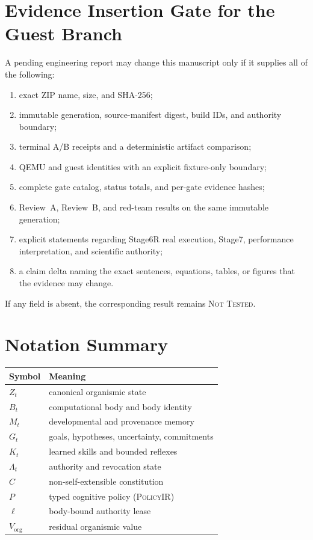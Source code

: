 \documentclass[journal,10pt]{IEEEtran}
\newcommand{\PolicyIR}{\textsc{PolicyIR}}
\newcommand{\NotTested}{\textsc{Not Tested}}
\begin{document}
\section{Evidence Insertion Gate for the Guest Branch}
A pending engineering report may change this manuscript only if it supplies all of the following:
\begin{enumerate}
  \item exact ZIP name, size, and SHA-256;
  \item immutable generation, source-manifest digest, build IDs, and authority boundary;
  \item terminal A/B receipts and a deterministic artifact comparison;
  \item QEMU and guest identities with an explicit fixture-only boundary;
  \item complete gate catalog, status totals, and per-gate evidence hashes;
  \item Review~A, Review~B, and red-team results on the same immutable generation;
  \item explicit statements regarding Stage6R real execution, Stage7, performance interpretation, and scientific authority;
  \item a claim delta naming the exact sentences, equations, tables, or figures that the evidence may change.
\end{enumerate}
If any field is absent, the corresponding result remains \NotTested{}.

\section{Notation Summary}
\begin{table}[t]
\centering
\small
\begin{tabular}{@{}ll@{}}
\toprule
Symbol & Meaning \\
\midrule
$Z_t$ & canonical organismic state \\
$B_t$ & computational body and body identity \\
$M_t$ & developmental and provenance memory \\
$G_t$ & goals, hypotheses, uncertainty, commitments \\
$K_t$ & learned skills and bounded reflexes \\
$\Lambda_t$ & authority and revocation state \\
$C$ & non-self-extensible constitution \\
$P$ & typed cognitive policy (\PolicyIR{}) \\
$\ell$ & body-bound authority lease \\
$V_{\mathrm{org}}$ & residual organismic value \\
\bottomrule
\end{tabular}
\end{table}

\renewcommand*{\bibfont}{\footnotesize}
\printbibliography
\end{document}
